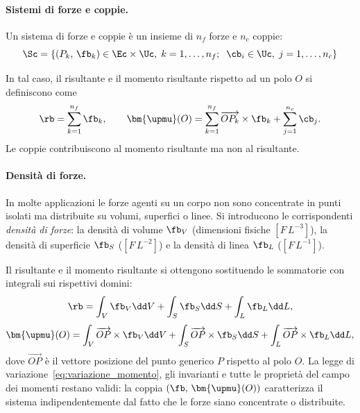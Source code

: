 



\paragraph{Sistemi di forze e coppie.}
Un sistema di forze e coppie è un insieme di $n_f$ forze e $n_c$ coppie:
\begin{equation}
\Sc=\{(P_k,\,\fb_k) \in \Ec\times\Uc, \;k=1,\dots,n_f; \;\; \cb_i\in\Uc, \; j=1, \dots, n_c\}
\end{equation}

In tal caso, il risultante e il momento risultante rispetto ad un polo $O$ si definiscono come
\begin{equation}\label{eq:riduzione_generalizzata}
	\rb = \sum_{k=1}^{n_f} \fb_k, \qquad
	\bm{\upmu}(O) = \sum_{k=1}^{n_f}
	\overrightarrow{OP_k} \times \fb_k
	+ \sum_{j=1}^{n_c} \cb_j.
\end{equation}
Le coppie contribuiscono al momento risultante ma non al
risultante.

\paragraph{Densità di forze.}
In molte applicazioni le forze agenti su un corpo non sono
concentrate in punti isolati ma distribuite su volumi,
superfici o linee. Si introducono le corrispondenti
\textit{densità di forze}: la densità di volume $\fb_V$
(dimensioni fisiche $[F\,L^{-3}]$), la densità di superficie
$\fb_S$ ($[F\,L^{-2}]$) e la densità di linea $\fb_L$
($[F\,L^{-1}]$).

Il risultante e il momento risultante si ottengono
sostituendo le sommatorie con integrali sui rispettivi domini:
\begin{equation}\label{eq:risultante_distribuite}
	\rb = \int_V \fb_V \dd V
	+ \int_S \fb_S \dd S
	+ \int_L \fb_L \dd L,
\end{equation}
\begin{equation}\label{eq:momento_distribuite}
	\bm{\upmu}(O) = \int_V \overrightarrow{OP}
	\times \fb_V \dd V
	+ \int_S \overrightarrow{OP}
	\times \fb_S \dd S
	+ \int_L \overrightarrow{OP}
	\times \fb_L \dd L,
\end{equation}
dove $\overrightarrow{OP}$ è il vettore posizione del punto
generico $P$ rispetto al polo $O$. La legge di
variazione~\eqref{eq:variazione_momento}, gli invarianti e
tutte le proprietà del campo dei momenti restano validi: la
coppia $(\fb,\,\bm{\upmu}(O))$ caratterizza il sistema
indipendentemente dal fatto che le forze siano concentrate o
distribuite.

